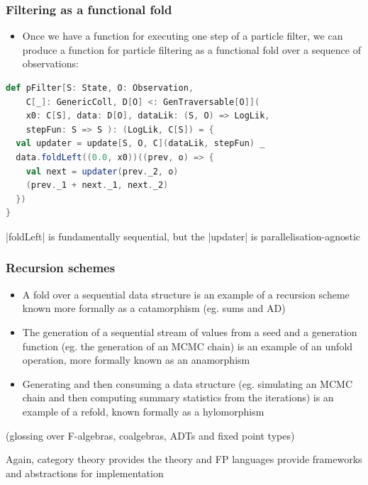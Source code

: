 \documentclass[mathserif,handout]{beamer}
\begin{document}
\begin{frame}[fragile]
  \frametitle{Filtering as a functional fold}
  \begin{itemize}
  \item Once we have a function for executing one step of a particle filter, we can produce a function for particle filtering as a functional fold over a sequence of observations:
  \end{itemize}
\begin{lstlisting}[language=scala]
def pFilter[S: State, O: Observation,
    C[_]: GenericColl, D[O] <: GenTraversable[O]](
    x0: C[S], data: D[O], dataLik: (S, O) => LogLik,
    stepFun: S => S ): (LogLik, C[S]) = {
  val updater = update[S, O, C](dataLik, stepFun) _
  data.foldLeft((0.0, x0))((prev, o) => {
    val next = updater(prev._2, o)
    (prev._1 + next._1, next._2)
  })
}
\end{lstlisting}
|foldLeft| is fundamentally sequential, but the |updater| is parallelisation-agnostic
\end{frame}

\begin{frame}
  \frametitle{Recursion schemes}
  \begin{itemize}
  \item A \alert{fold} over a sequential data structure is an example of a recursion scheme known more formally as a \alert{catamorphism} (eg. sums and AD)
  \item The generation of a sequential stream of values from a seed and a generation function (eg. the generation of an MCMC chain) is an example of an \alert{unfold} operation, more formally known as an \alert{anamorphism}
    \item Generating and then consuming a data structure (eg. simulating an MCMC chain and then computing summary statistics from the iterations) is an example of a \alert{refold}, known formally as a \alert{hylomorphism}
  \end{itemize}
  (glossing over \alert{F-algebras}, \alert{coalgebras}, \alert{ADTs} and \alert{fixed point types})
  \medskip
  
  Again, category theory provides the theory and FP languages provide frameworks and abstractions for implementation
\end{frame}
\end{document}
